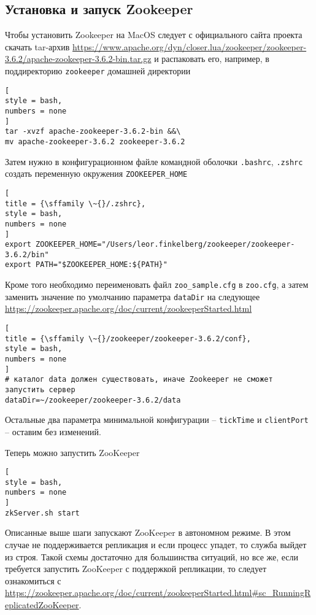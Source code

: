 \documentclass[%
	11pt,
	a4paper,
	utf8,
		]{article}
\begin{document}
\subsection{Установка и запуск Zookeeper}\label{subsec:zookeeper}

Чтобы установить Zookeeper на MacOS следует с официального сайта проекта скачать tar-архив \url{https://www.apache.org/dyn/closer.lua/zookeeper/zookeeper-3.6.2/apache-zookeeper-3.6.2-bin.tar.gz} и распаковать его, например, в поддиректорию \texttt{zookeeper} домашней директории
\begin{lstlisting}[
style = bash,
numbers = none	
]
tar -xvzf apache-zookeeper-3.6.2-bin &&\
mv apache-zookeeper-3.6.2 zookeeper-3.6.2
\end{lstlisting}

Затем нужно в конфигурационном файле командной оболочки \texttt{.bashrc}, \texttt{.zshrc} создать переменную окружения \texttt{ZOOKEEPER\_HOME}
\begin{lstlisting}[
title = {\sffamily \~{}/.zshrc},
style = bash,
numbers = none	
]
export ZOOKEEPER_HOME="/Users/leor.finkelberg/zookeeper/zookeeper-3.6.2/bin"
export PATH="$ZOOKEEPER_HOME:${PATH}"
\end{lstlisting}

Кроме того необходимо переименовать файл \texttt{zoo\_sample.cfg} в \texttt{zoo.cfg}, а затем заменить значение по умолчанию параметра \texttt{dataDir} на следующее \url{https://zookeeper.apache.org/doc/current/zookeeperStarted.html}
\begin{lstlisting}[
title = {\sffamily \~{}/zookeeper/zookeeper-3.6.2/conf},
style = bash,
numbers = none	
]
# каталог data должен существовать, иначе Zookeeper не сможет запустить сервер
dataDir=~/zookeeper/zookeeper-3.6.2/data
\end{lstlisting}
Остальные два параметра минимальной конфигурации -- \texttt{tickTime} и \texttt{clientPort} -- оставим без изменений.

Теперь можно запустить ZooKeeper
\begin{lstlisting}[
style = bash,
numbers = none	
]
zkServer.sh start 
\end{lstlisting}

Описанные выше шаги запускают ZooKeeper в автономном режиме. В этом случае не поддерживается репликация и если процесс упадет, то служба выйдет из строя. Такой схемы достаточно для большинства ситуаций, но все же, если требуется запустить ZooKeeper с поддержкой репликации, то следует ознакомиться с \url{https://zookeeper.apache.org/doc/current/zookeeperStarted.html#sc_RunningReplicatedZooKeeper}.
\end{document}
